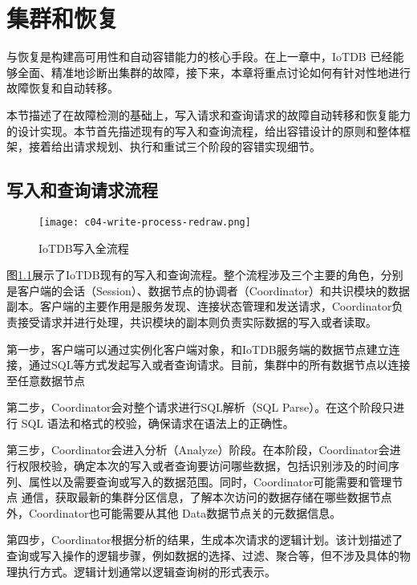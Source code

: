 
\chapter{集群\failover 和恢复}

\failover 与恢复是构建高可用性和自动容错能力的核心手段。在上一章中，IoTDB 已经能够全面、精准地诊断出集群的故障，接下来，本章将重点讨论如何有针对性地进行故障恢复和自动转移。

本节描述了在故障检测的基础上，写入请求和查询请求的故障自动转移和恢复能力的设计实现。本节首先描述现有的写入和查询流程，给出容错设计的原则和整体框架，接着给出请求规划、执行和重试三个阶段的容错实现细节。

\section{写入和查询请求流程}

\begin{figure}
  \centering
  \texttt{[image: c04-write-process-redraw.png]}
  \caption{IoTDB写入全流程}
  \label{fig:c04-write-process}
\end{figure}

图\ref{fig:c04-write-process}展示了IoTDB现有的写入和查询流程。整个流程涉及三个主要的角色，分别是客户端的会话（Session）、数据节点的协调者（Coordinator）和共识模块的数据副本。客户端的主要作用是服务发现、连接状态管理和发送请求，Coordinator负责接受请求并进行处理，共识模块的副本则负责实际数据的写入或者读取。

第一步，客户端可以通过实例化客户端对象，和IoTDB服务端的数据节点建立连接，通过SQL等方式发起写入或者查询请求。目前，集群中的所有数据节点以连接至任意数据节点

第二步，Coordinator会对整个请求进行SQL解析（SQL Parse）。在这个阶段只进行 SQL 语法和格式的校验，确保请求在语法上的正确性。

第三步，Coordinator会进入分析（Analyze）阶段。在本阶段，Coordinator会进行权限校验，确定本次的写入或者查询要访问哪些数据，包括识别涉及的时间序列、属性以及需要查询或写入的数据范围。同时，Coordinator可能需要和管理节点 通信，获取最新的集群分区信息，了解本次访问的数据存储在哪些数据节点外，Coordinator也可能需要从其他 Data数据节点关的元数据信息。

第四步，Coordinator根据分析的结果，生成本次请求的逻辑计划。该计划描述了查询或写入操作的逻辑步骤，例如数据的选择、过滤、聚合等，但不涉及具体的物理执行方式。逻辑计划通常以逻辑查询树的形式表示。


